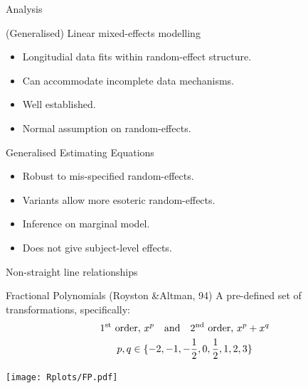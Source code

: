 \begin{frame}{Analysis}

  \begin{block}{(Generalised) Linear mixed-effects modelling}
    \begin{itemize}
    \item Longitudial data fits within random-effect structure.
    \item Can accommodate incomplete data mechanisms.
    \item Well established.
    \item Normal assumption on random-effects.
    \end{itemize}
  \end{block}
  
  \begin{block}{Generalised Estimating Equations}
    \begin{itemize}
    \item Robust to mis-specified random-effects.
    \item Variants allow more esoteric random-effects.
    \item Inference on marginal model.
    \item Does not give subject-level effects.
    \end{itemize}
  \end{block}
  
\end{frame}

\begin{frame}{Non-straight line relationships}
  
  \begin{block}{Fractional Polynomials (Royston \&Altman, 94)}
    A pre-defined set of transformations, specifically:
    \begin{gather*}
      \text{1\textsuperscript{st} order, } x^{p} \quad\text{and}\quad
      \text{2\textsuperscript{nd} order, } x^{p} + x^{q}\\
      p,q \in \{-2,-1,-\frac{1}{2},0,\frac{1}{2},1,2,3\}
    \end{gather*}
  \end{block}
  \pause
  \begin{adjustbox}{center}
    \texttt{[image: Rplots/FP.pdf]}
  \end{adjustbox}%
\end{frame}

